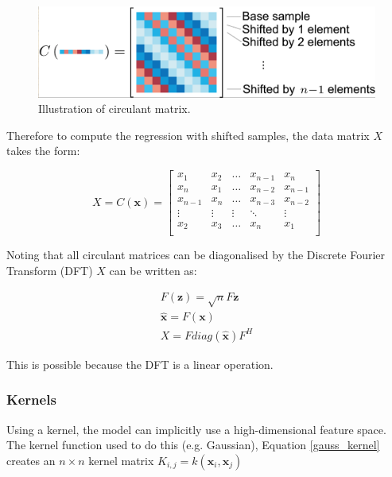 \documentclass[a4paper,11pt,notitlepage]{article}
\begin{document}
\noindent \begin{figure}[h!]
	\includegraphics[width = 1.0\hsize]{figures/circular_shift.png}
	\caption{Illustration of circulant matrix.\cite{kcf}}
	\label{circular_data}
\end{figure}

Therefore to compute the regression with shifted samples, the data matrix $X$ takes the form:

\begin{equation}
X = C(\mathbf{x}) = 
\begin{bmatrix}
x_{1} & x_{2} & \dots & x_{n-1} & x_{n} \\
x_{n} & x_{1} & \dots & x_{n-2}  & x_{n-1}  \\
x_{n-1} & x_{n} & \dots & x_{n-3} & x_{n-2}  \\
\vdots & \vdots & \vdots & \ddots & \vdots \\
x_{2}  & x_{3}  & \dots & x_{n} & x_{1} \\
\end{bmatrix}
\end{equation}

Noting that all circulant matrices can be diagonalised by the Discrete Fourier Transform (DFT) $X$ can be written as:


\begin{equation}
\begin{aligned}
\mathit{F}(\mathbf{z}) = \sqrt{n}F\mathbf{z} \\
\hat{\mathbf{x}} = \mathit{F}(\mathbf{x}) \\
X = F diag(\hat{\mathbf{x}}) F^{H}
\end{aligned}
\end{equation}

This is possible because the DFT is a linear operation. 

\subsubsection{Kernels}\label{kcf_kernels}

Using a kernel, the model can implicitly use a high-dimensional feature space. The kernel function used to do this (e.g. Gaussian), Equation \ref{gauss_kernel} creates an $n \times n$ kernel matrix $K_{i,j} = k(\mathbf{x}_{i},\mathbf{x}_{j})$
\end{document}
